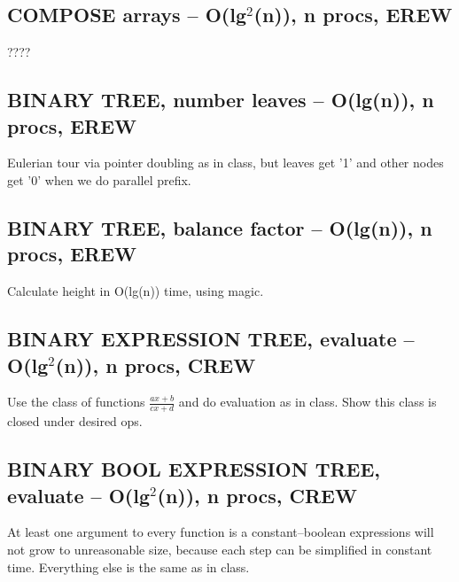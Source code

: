 \documentclass[12pt]{article}
\begin{document}
\subsection{COMPOSE arrays -- O(lg$^2$(n)), n procs, EREW}
????

\subsection{BINARY TREE, number leaves -- O(lg(n)), n procs, EREW}
Eulerian tour via pointer doubling as in class, but leaves get '1' and other nodes get '0' when we do parallel prefix.

\subsection{BINARY TREE, balance factor -- O(lg(n)), n procs, EREW}
Calculate height in O(lg(n)) time, using magic.

\subsection{BINARY EXPRESSION TREE, evaluate -- O(lg$^2$(n)), n procs, CREW}
Use the class of functions $\frac{ax+b}{cx+d}$ and do evaluation as in class. Show this class is closed under desired ops.

\subsection{BINARY BOOL EXPRESSION TREE, evaluate -- O(lg$^2$(n)), n procs, CREW}
At least one argument to every function is a constant--boolean expressions will not grow to unreasonable size, because each step can be simplified in constant time. Everything else is the same as in class. 
\end{document}

